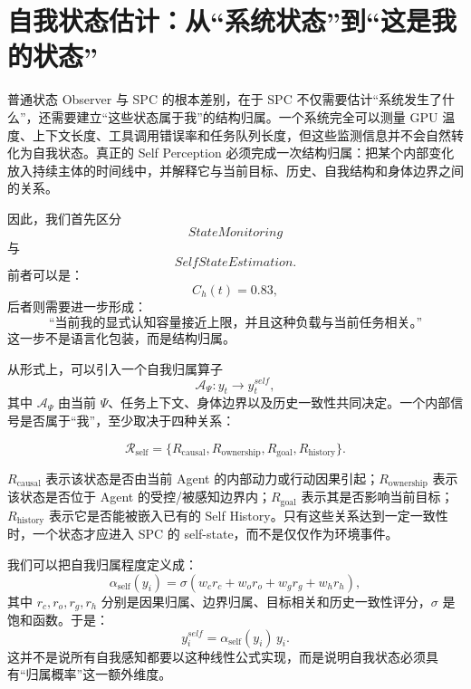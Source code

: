 \section{自我状态估计：从“系统状态”到“这是我的状态”}
\label{sec:spc-self-state-estimation}

普通状态 Observer 与 SPC 的根本差别，在于 SPC 不仅需要估计“系统发生了什么”，还需要建立“这些状态属于我”的结构归属。一个系统完全可以测量 GPU 温度、上下文长度、工具调用错误率和任务队列长度，但这些监测信息并不会自然转化为自我状态。真正的 Self Perception 必须完成一次结构归属：把某个内部变化放入持续主体的时间线中，并解释它与当前目标、历史、自我结构和身体边界之间的关系。

因此，我们首先区分
\begin{equation}
StateMonitoring
\end{equation}
与
\begin{equation}
SelfStateEstimation.
\end{equation}
前者可以是：
\begin{equation}
C_h(t)=0.83,
\end{equation}
后者则需要进一步形成：
\begin{equation}
\text{“当前我的显式认知容量接近上限，并且这种负载与当前任务相关。”}
\end{equation}
这一步不是语言化包装，而是结构归属。

从形式上，可以引入一个自我归属算子
\begin{equation}
\mathcal A_\Psi:
y_t
\longrightarrow
y_t^{self},
\end{equation}
其中 $\mathcal A_\Psi$ 由当前 $\Psi$、任务上下文、身体边界以及历史一致性共同决定。一个内部信号是否属于“我”，至少取决于四种关系：

\begin{equation}
\mathcal R_{\mathrm{self}}
=
\{
R_{\mathrm{causal}},
R_{\mathrm{ownership}},
R_{\mathrm{goal}},
R_{\mathrm{history}}
\}.
\end{equation}

$R_{\mathrm{causal}}$ 表示该状态是否由当前 Agent 的内部动力或行动因果引起；$R_{\mathrm{ownership}}$ 表示该状态是否位于 Agent 的受控/被感知边界内；$R_{\mathrm{goal}}$ 表示其是否影响当前目标；$R_{\mathrm{history}}$ 表示它是否能被嵌入已有的 Self History。只有这些关系达到一定一致性时，一个状态才应进入 SPC 的 self-state，而不是仅仅作为环境事件。

我们可以把自我归属程度定义成：
\begin{equation}
\alpha_{\mathrm{self}}(y_i)
=
\sigma
\left(
w_c r_c+
w_o r_o+
w_g r_g+
w_h r_h
\right),
\end{equation}
其中 $r_c,r_o,r_g,r_h$ 分别是因果归属、边界归属、目标相关和历史一致性评分，$\sigma$ 是饱和函数。于是：
\begin{equation}
y_i^{self}
=
\alpha_{\mathrm{self}}(y_i)\,y_i.
\end{equation}
这并不是说所有自我感知都要以这种线性公式实现，而是说明自我状态必须具有“归属概率”这一额外维度。

